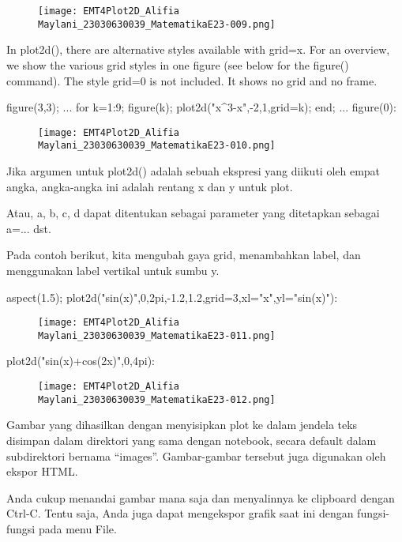 \documentclass{article}
\begin{document}
\begin{figure}
    \centering
    \texttt{[image: EMT4Plot2D\_Alifia Maylani\_23030630039\_MatematikaE23-009.png]}
    \caption{}
    \label{fig:enter-label}
\end{figure}

In plot2d(), there are alternative styles available with grid=x. For an overview, we
show the various grid styles in one figure (see below for the figure() command). The
style grid=0 is not included. It shows no grid and no frame.


\>figure(3,3); ...  
\>   for k=1:9; figure(k); plot2d("x^3-x",-2,1,grid=k); end; ...  
\>   figure(0):


\begin{figure}
    \centering
    \texttt{[image: EMT4Plot2D\_Alifia Maylani\_23030630039\_MatematikaE23-010.png]}
    \caption{}
    \label{fig:enter-label}
\end{figure}

Jika argumen untuk plot2d() adalah sebuah ekspresi yang diikuti oleh
empat angka, angka-angka ini adalah rentang x dan y untuk plot.


Atau, a, b, c, d dapat ditentukan sebagai parameter yang ditetapkan
sebagai a=... dst.


Pada contoh berikut, kita mengubah gaya grid, menambahkan label, dan
menggunakan label vertikal untuk sumbu y.


\>aspect(1.5); plot2d("sin(x)",0,2pi,-1.2,1.2,grid=3,xl="x",yl="sin(x)"):


\begin{figure}
    \centering
    \texttt{[image: EMT4Plot2D\_Alifia Maylani\_23030630039\_MatematikaE23-011.png]}
    \caption{}
    \label{fig:enter-label}
\end{figure}

\>plot2d("sin(x)+cos(2\*x)",0,4pi):


\begin{figure}
    \centering
    \texttt{[image: EMT4Plot2D\_Alifia Maylani\_23030630039\_MatematikaE23-012.png]}
    \caption{}
    \label{fig:enter-label}
\end{figure}

Gambar yang dihasilkan dengan menyisipkan plot ke dalam jendela teks
disimpan dalam direktori yang sama dengan notebook, secara default
dalam subdirektori bernama “images”. Gambar-gambar tersebut juga
digunakan oleh ekspor HTML.


Anda cukup menandai gambar mana saja dan menyalinnya ke clipboard
dengan Ctrl-C. Tentu saja, Anda juga dapat mengekspor grafik saat ini
dengan fungsi-fungsi pada menu File.
\end{document}
